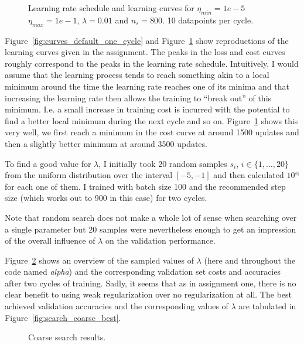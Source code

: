 \documentclass{article}
\begin{document}
\begin{figure}[H]
  \centering
    
  \caption{Learning rate schedule and learning curves for $\eta_{min} = 1e-5$
           $\eta_{max} = 1e-1$, $\lambda = 0.01$ and $n_s = 800$. 10 datapoints
           per cycle.}
  \label{fig:curves_default_three_cycles}
\end{figure}

\noindent
Figure~\ref{fig:curves_default_one_cycle} and
Figure~\ref{fig:curves_default_three_cycles} show reproductions of the learning
curves given in the assignment. The peaks in the loss and cost curves roughly
correspond to the peaks in the learning rate schedule. Intuitively, I would
assume that the learning process tends to reach something akin to a local
minimum around the time the learning rate reaches one of its minima and that
increasing the learning rate then allows the training to ``break out'' of this
minimum. I.e. a small increase in training cost is incurred with the potential
to find a better local minimum during the next cycle and so on.
Figure~\ref{fig:curves_default_three_cycles} shows this very well, we first
reach a minimum in the cost curve at around 1500 updates and then a slightly
better minimum at around 3500 updates.

To find a good value for $\lambda$, I initially took 20 random samples $s_i$,
$i \in \{1, \dots, 20\}$ from the uniform distribution over the interval $[-5,
-1]$ and then calculated $10^{s_i}$ for each one of them. I trained with batch
size 100 and the recommended step size (which works out to 900 in this case)
for two cycles.

Note that random search does not make a whole lot of sense when searching over
a single parameter but 20 samples were nevertheless enough to get an
impression of the overall influence of $\lambda$ on the validation performance.

Figure~\ref{fig:search_coarse} shows an overview of the sampled values of
$\lambda$ (here and throughout the code named \textit{alpha}) and the
corresponding validation set costs and accuracies after two cycles of training.
Sadly, it seems that as in assignment one, there is no clear benefit to using
weak regularization over no regularization at all. The best achieved
validation accuracies and the corresponding values of $\lambda$ are tabulated
in Figure~\ref{fig:search_coarse_best}.

\begin{figure}[H]
  \centering
    
  \caption{Coarse search results.}
  \label{fig:search_coarse}
\end{figure}
\end{document}
